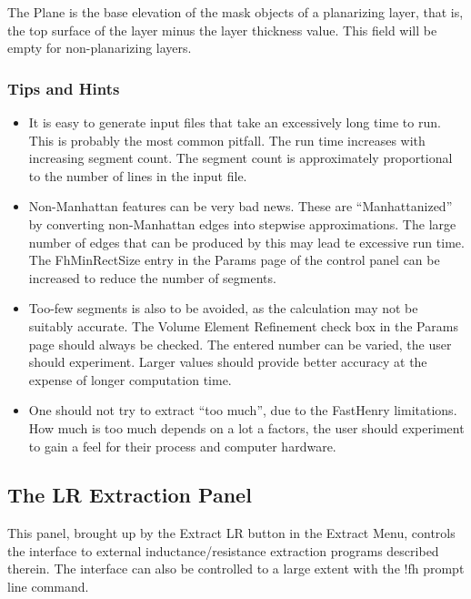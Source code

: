The {\vt Plane} is the base elevation of the mask objects of a
planarizing layer, that is, the top surface of the layer minus the
layer thickness value.  This field will be empty for non-planarizing
layers.

\subsubsection{Tips and Hints}

\begin{itemize}
\item{It is easy to generate input files that take an excessively
long time to run.  This is probably the most common pitfall.  The
run time increases with increasing segment count.  The segment  
count is approximately proportional to the number of lines in the
input file.}

\item{Non-Manhattan features can be very bad news.  These are
``Manhattanized'' by converting non-Manhattan edges into stepwise
approximations.  The large number of edges that can be produced by
this may lead te excessive run time.  The {\cb FhMinRectSize} entry in
the {\cb Params} page of the control panel can be increased to reduce
the number of segments.}

\item{Too-few segments is also to be avoided, as the calculation may
not be suitably accurate.  The {\cb Volume Element Refinement} check
box in the {\cb Params} page should always be checked.  The entered
number can be varied, the user should experiment.  Larger values
should provide better accuracy at the expense of longer computation
time.}

\item{One should not try to extract ``too much'', due to the FastHenry
limitations.  How much is too much depends on a lot a factors, the
user should experiment to gain a feel for their process and computer
hardware.}
\end{itemize}


\subsection{The LR Extraction Panel}
\label{fhpanel}
This panel, brought up by the {\cb Extract LR} button in the {\cb
Extract Menu}, controls the interface to external
inductance/resistance extraction programs described therein.  The
interface can also be controlled to a large extent with the {\cb !fh}
prompt line command.

